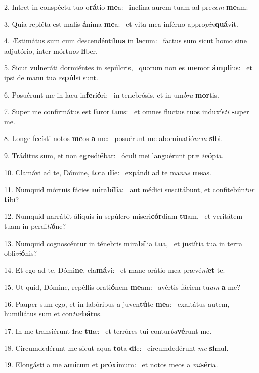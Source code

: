 2. Intret in conspéctu tuo o\textbf{rá}tio \textbf{me}a: \ast\  inclína aurem tuam ad pre\textit{cem} \textbf{me}am:\

3. Quia repléta est malis \textbf{á}nima \textbf{me}a: \ast\  et vita mea inférno appro\textit{pin}\textbf{quá}vit.\

4. Æstimátus sum cum descendénti\textbf{bus} in \textbf{la}cum: \ast\  factus sum sicut homo sine adjutório, inter mórtu\textit{os} \textbf{li}ber.\

5. Sicut vulneráti dormiéntes in sepúlcris, \dag\  quorum non es \textbf{me}mor \textbf{ám}\textbf{pli}us: \ast\  et ipsi de manu tua \textit{re}\textbf{púl}si sunt.\

6. Posuérunt me in lacu in\textbf{fe}ri\textbf{ó}ri: \ast\  in tenebrósis, et in um\textit{bra} \textbf{mor}tis.\

7. Super me confirmátus est \textbf{fu}ror \textbf{tu}us: \ast\  et omnes fluctus tuos induxís\textit{ti} \textbf{su}per me.\

8. Longe fecísti notos \textbf{me}os \textbf{a} me: \ast\  posuérunt me abominatió\textit{nem} \textbf{si}bi.\

9. Tráditus sum, et non e\textbf{gre}di\textbf{é}bar: \ast\  óculi mei languérunt præ \textit{in}\textbf{ó}pia.\

10. Clamávi ad te, Dómine, \textbf{to}ta \textbf{di}e: \ast\  expándi ad te ma\textit{nus} \textbf{me}as.\

11. Numquid mórtuis fácies \textbf{mi}ra\textbf{bí}\textbf{li}a: \ast\  aut médici suscitábunt, et confitebún\textit{tur} \textbf{ti}bi?\

12. Numquid narrábit áliquis in sepúlcro miseri\textbf{cór}diam \textbf{tu}am, \ast\  et veritátem tuam in perdi\textit{ti}\textbf{ó}ne?\

13. Numquid cognoscéntur in ténebris mira\textbf{bí}lia \textbf{tu}a, \ast\  et justítia tua in terra obli\textit{vi}\textbf{ó}nis?\

14. Et ego ad te, Dómi\textbf{ne}, cla\textbf{má}vi: \ast\  et mane orátio mea prævé\textit{ni}\textbf{et} te.\

15. Ut quid, Dómine, repéllis orati\textbf{ó}nem \textbf{me}am: \ast\  avértis fáciem tu\textit{am} \textbf{a} me?\

16. Pauper sum ego, et in labóribus a juven\textbf{tú}te \textbf{me}a: \ast\  exaltátus autem, humiliátus sum et con\textit{tur}\textbf{bá}tus.\

17. In me transiérunt \textbf{i}ræ \textbf{tu}æ: \ast\  et terróres tui contur\textit{ba}\textbf{vé}runt me.\

18. Circumdedérunt me sicut aqua \textbf{to}ta \textbf{di}e: \ast\  circumdedérunt \textit{me} \textbf{si}mul.\

19. Elongásti a me a\textbf{mí}cum et \textbf{pró}\textbf{xi}mum: \ast\  et notos meos a \textit{mi}\textbf{sé}ria.\

